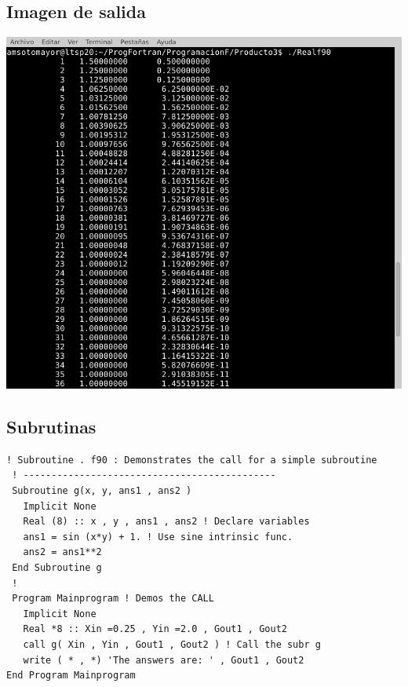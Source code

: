 \documentclass[letterpaper,10pt,twoside,onecolumn]{article}
\begin{document}
\subsection{Imagen de salida}
\includegraphics[scale=.75]{Real4.png}

\subsection{Subrutinas}
\begin{verbatim}
! Subroutine . f90 : Demonstrates the call for a simple subroutine
 ! ---------------------------------------------
 Subroutine g(x, y, ans1 , ans2 )
   Implicit None
   Real (8) :: x , y , ans1 , ans2 ! Declare variables
   ans1 = sin (x*y) + 1. ! Use sine intrinsic func.
   ans2 = ans1**2
 End Subroutine g
 !
 Program Mainprogram ! Demos the CALL
   Implicit None
   Real *8 :: Xin =0.25 , Yin =2.0 , Gout1 , Gout2
   call g( Xin , Yin , Gout1 , Gout2 ) ! Call the subr g
   write ( * , *) 'The answers are: ' , Gout1 , Gout2
End Program Mainprogram 
\end{verbatim}     
\end{document}
